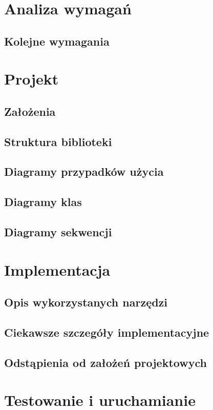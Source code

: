 \documentclass[11pt,twoside,a4paper,final]{llncs}
\begin{document}
\section{Analiza wymagań}
\subsection{Kolejne wymagania\newline}

\section{Projekt}
\subsection{Założenia}
\subsection{Struktura biblioteki}
\subsection{Diagramy przypadków użycia}
\subsection{Diagramy klas}
\subsection{Diagramy sekwencji\newline}

\section{Implementacja}
\subsection{Opis wykorzystanych narzędzi}
\subsection{Ciekawsze szczegóły implementacyjne}
\subsection{Odstąpienia od założeń projektowych\newline}

\section{Testowanie i uruchamianie}
\end{document}
